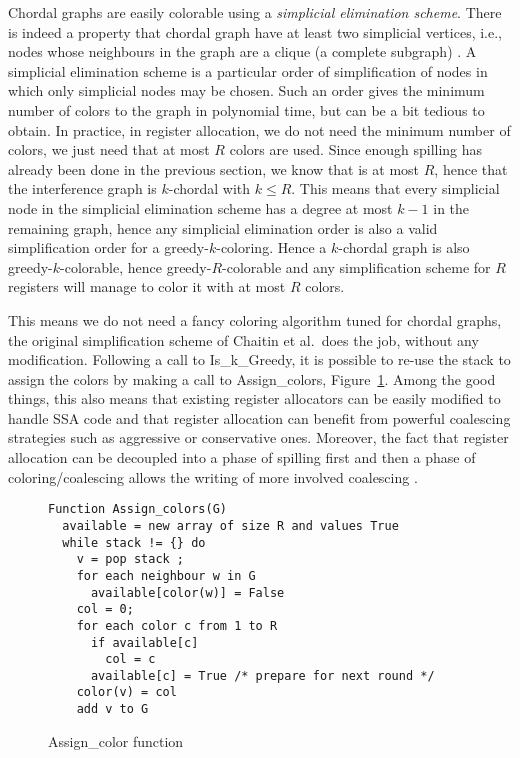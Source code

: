 {Chordal graphs are easily colorable using a \emph{simplicial elimination 
scheme}. There is indeed a property that chordal graph have at least two 
simplicial vertices, i.e., nodes whose neighbours in the graph are a clique (a 
complete subgraph) .  
A simplicial elimination scheme is a particular order of simplification of 
nodes in which only simplicial nodes may be chosen. Such an order gives the 
minimum number of colors to the graph in polynomial time, but can be a bit 
tedious to obtain. In practice, in register allocation, we do not need the 
minimum number of colors, we just need that at most $R$ colors are used. Since 
enough spilling has already been done in the previous section, we know that 
\maxlive is at most $R$, hence that the interference graph is $k$-chordal with 
$k\leq R$. This means that every simplicial node in the simplicial elimination 
scheme has a degree at most $k-1$ in the remaining graph, hence any simplicial 
elimination order is also a valid simplification order for a 
greedy-$k$-coloring. Hence a $k$-chordal graph is also greedy-$k$-colorable, 
hence greedy-$R$-colorable and any simplification scheme for $R$ registers will 
manage to color it with at most $R$ colors.


This means we do not need a fancy coloring algorithm tuned for chordal graphs, 
the original simplification scheme of Chaitin et al.\ does the job, without any 
modification. Following a call to Is\_k\_Greedy, it is possible to re-use the 
stack to assign the colors by making a call to Assign\_colors, 
Figure~\ref{code:assign-color}. Among the good things, this also means that 
existing register allocators can be easily modified to handle SSA code and that 
register allocation can benefit from powerful coalescing strategies such as 
aggressive or conservative ones. Moreover, the fact that register allocation 
can be decoupled into a phase of spilling first and then a phase of 
coloring/coalescing allows the writing of more involved coalescing .


\begin{figure}
\begin{verbatim}
Function Assign_colors(G)
  available = new array of size R and values True
  while stack != {} do
    v = pop stack ;
    for each neighbour w in G
      available[color(w)] = False
    col = 0;
    for each color c from 1 to R
      if available[c]
        col = c
      available[c] = True /* prepare for next round */
    color(v) = col
    add v to G
\end{verbatim}
\caption{Assign\_color function}
\label{code:assign-color}
\end{figure}





}
